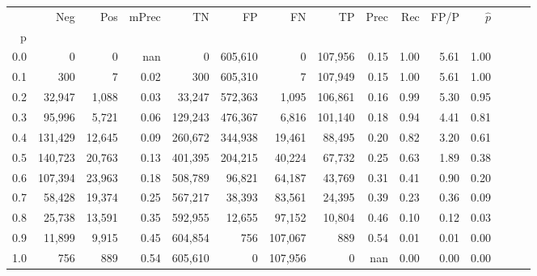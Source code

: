\begin{tabular}{rrrrrrrrrrrrrrr}
\toprule
{} &      Neg &     Pos & mPrec &       TN &       FP &       FN &       TP &  Prec &   Rec &  FP/P & $\hat{p}$ \\
p   &          &         &       &          &          &          &          &       &       &       &           \\
\midrule
0.0 &        0 &       0 &   nan &        0 &  605,610 &        0 &  107,956 &  0.15 &  1.00 &  5.61 &      1.00 \\
0.1 &      300 &       7 &  0.02 &      300 &  605,310 &        7 &  107,949 &  0.15 &  1.00 &  5.61 &      1.00 \\
0.2 &   32,947 &   1,088 &  0.03 &   33,247 &  572,363 &    1,095 &  106,861 &  0.16 &  0.99 &  5.30 &      0.95 \\
0.3 &   95,996 &   5,721 &  0.06 &  129,243 &  476,367 &    6,816 &  101,140 &  0.18 &  0.94 &  4.41 &      0.81 \\
0.4 &  131,429 &  12,645 &  0.09 &  260,672 &  344,938 &   19,461 &   88,495 &  0.20 &  0.82 &  3.20 &      0.61 \\
0.5 &  140,723 &  20,763 &  0.13 &  401,395 &  204,215 &   40,224 &   67,732 &  0.25 &  0.63 &  1.89 &      0.38 \\
0.6 &  107,394 &  23,963 &  0.18 &  508,789 &   96,821 &   64,187 &   43,769 &  0.31 &  0.41 &  0.90 &      0.20 \\
0.7 &   58,428 &  19,374 &  0.25 &  567,217 &   38,393 &   83,561 &   24,395 &  0.39 &  0.23 &  0.36 &      0.09 \\
0.8 &   25,738 &  13,591 &  0.35 &  592,955 &   12,655 &   97,152 &   10,804 &  0.46 &  0.10 &  0.12 &      0.03 \\
0.9 &   11,899 &   9,915 &  0.45 &  604,854 &      756 &  107,067 &      889 &  0.54 &  0.01 &  0.01 &      0.00 \\
1.0 &      756 &     889 &  0.54 &  605,610 &        0 &  107,956 &        0 &   nan &  0.00 &  0.00 &      0.00 \\
\bottomrule
\end{tabular}
